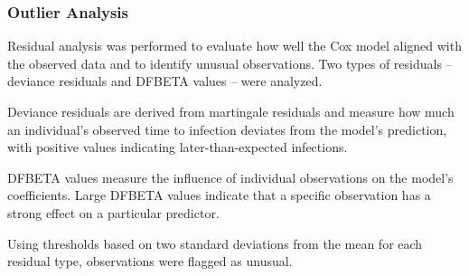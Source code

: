 \documentclass[12pt]{article}
\newenvironment{Shaded}{\begin{snugshade}}{\end{snugshade}}
\newcommand{\CommentTok}[1]{\textcolor[rgb]{0.56,0.35,0.01}{\textit{#1}}}
\newcommand{\DecValTok}[1]{\textcolor[rgb]{0.00,0.00,0.81}{#1}}
\newcommand{\FunctionTok}[1]{\textcolor[rgb]{0.13,0.29,0.53}{\textbf{#1}}}
\newcommand{\NormalTok}[1]{#1}
\newcommand{\OtherTok}[1]{\textcolor[rgb]{0.56,0.35,0.01}{#1}}
\newcommand{\SpecialCharTok}[1]{\textcolor[rgb]{0.81,0.36,0.00}{\textbf{#1}}}
\newcommand{\StringTok}[1]{\textcolor[rgb]{0.31,0.60,0.02}{#1}}
\begin{document}
\subsubsection{\texorpdfstring{\textbf{Outlier
Analysis}}{Outlier Analysis}}\label{outlier-analysis}

Residual analysis was performed to evaluate how well the Cox model
aligned with the observed data and to identify unusual observations. Two
types of residuals -- deviance residuals and DFBETA values -- were
analyzed.

Deviance residuals are derived from martingale residuals and measure how
much an individual's observed time to infection deviates from the
model's prediction, with positive values indicating later-than-expected
infections.

DFBETA values measure the influence of individual observations on the
model's coefficients. Large DFBETA values indicate that a specific
observation has a strong effect on a particular predictor.

Using thresholds based on two standard deviations from the mean for each
residual type, observations were flagged as unusual.

\begin{Shaded}
\end{Shaded}
\end{document}
